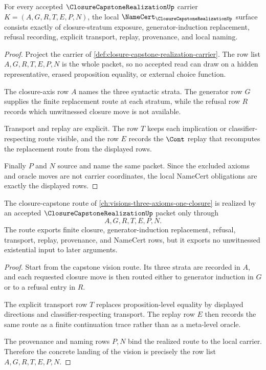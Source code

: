 \begin{theorem}
\label{thm:closure-capstone-realization-namecert-obligations}
For every accepted $\ClosureCapstoneRealizationUp$ carrier $K=(A,G,R,T,E,P,N)$, the local $\NameCert_{\ClosureCapstoneRealizationUp}$ surface consists exactly of closure-stratum exposure, generator-induction replacement, refusal recording, explicit transport, replay, provenance, and local naming.
\end{theorem}
\begin{proof}
Project the carrier of \autoref{def:closure-capstone-realization-carrier}. The row list $A,G,R,T,E,P,N$ is the whole packet, so no accepted read can draw on a hidden representative, erased proposition equality, or external choice function.

The closure-axis row $A$ names the three syntactic strata. The generator row $G$ supplies the finite replacement route at each stratum, while the refusal row $R$ records which unwitnessed closure move is not available.

Transport and replay are explicit. The row $T$ keeps each implication or classifier-respecting route visible, and the row $E$ records the $\Cont$ replay that recomputes the replacement route from the displayed rows.

Finally $P$ and $N$ source and name the same packet. Since the excluded axioms and oracle moves are not carrier coordinates, the local NameCert obligations are exactly the displayed rows.
\end{proof}

\begin{theorem}
\label{thm:closure-capstone-realization-vision-route}
The closure-capstone route of \autoref{ch:visions-three-axioms-one-closure} is realized by an accepted $\ClosureCapstoneRealizationUp$ packet only through
$$
A,G,R,T,E,P,N.
$$
The route exports finite closure, generator-induction replacement, refusal, transport, replay, provenance, and NameCert rows, but it exports no unwitnessed existential input to later arguments.
\end{theorem}
\begin{proof}
Start from the capstone vision route. Its three strata are recorded in $A$, and each requested closure move is then routed either to generator induction in $G$ or to a refusal entry in $R$.

The explicit transport row $T$ replaces proposition-level equality by displayed directions and classifier-respecting transport. The replay row $E$ then records the same route as a finite continuation trace rather than as a meta-level oracle.

The provenance and naming rows $P,N$ bind the realized route to the local carrier. Therefore the concrete landing of the vision is precisely the row list $A,G,R,T,E,P,N$.
\end{proof}

